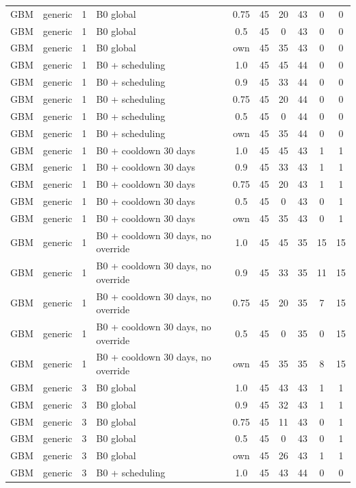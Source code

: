 \begin{longtable}{lllp{4.4cm}cccccc}
GBM & generic & 1 & B0 global & 0.75 & 45 & 20 & 43 & 0 & 0 \\
GBM & generic & 1 & B0 global & 0.5 & 45 & 0 & 43 & 0 & 0 \\
GBM & generic & 1 & B0 global & own & 45 & 35 & 43 & 0 & 0 \\
GBM & generic & 1 & B0 + scheduling & 1.0 & 45 & 45 & 44 & 0 & 0 \\
GBM & generic & 1 & B0 + scheduling & 0.9 & 45 & 33 & 44 & 0 & 0 \\
GBM & generic & 1 & B0 + scheduling & 0.75 & 45 & 20 & 44 & 0 & 0 \\
GBM & generic & 1 & B0 + scheduling & 0.5 & 45 & 0 & 44 & 0 & 0 \\
GBM & generic & 1 & B0 + scheduling & own & 45 & 35 & 44 & 0 & 0 \\
GBM & generic & 1 & B0 + cooldown 30 days & 1.0 & 45 & 45 & 43 & 1 & 1 \\
GBM & generic & 1 & B0 + cooldown 30 days & 0.9 & 45 & 33 & 43 & 1 & 1 \\
GBM & generic & 1 & B0 + cooldown 30 days & 0.75 & 45 & 20 & 43 & 1 & 1 \\
GBM & generic & 1 & B0 + cooldown 30 days & 0.5 & 45 & 0 & 43 & 0 & 1 \\
GBM & generic & 1 & B0 + cooldown 30 days & own & 45 & 35 & 43 & 0 & 1 \\
GBM & generic & 1 & B0 + cooldown 30 days, no override & 1.0 & 45 & 45 & 35 & 15 & 15 \\
GBM & generic & 1 & B0 + cooldown 30 days, no override & 0.9 & 45 & 33 & 35 & 11 & 15 \\
GBM & generic & 1 & B0 + cooldown 30 days, no override & 0.75 & 45 & 20 & 35 & 7 & 15 \\
GBM & generic & 1 & B0 + cooldown 30 days, no override & 0.5 & 45 & 0 & 35 & 0 & 15 \\
GBM & generic & 1 & B0 + cooldown 30 days, no override & own & 45 & 35 & 35 & 8 & 15 \\
GBM & generic & 3 & B0 global & 1.0 & 45 & 43 & 43 & 1 & 1 \\
GBM & generic & 3 & B0 global & 0.9 & 45 & 32 & 43 & 1 & 1 \\
GBM & generic & 3 & B0 global & 0.75 & 45 & 11 & 43 & 0 & 1 \\
GBM & generic & 3 & B0 global & 0.5 & 45 & 0 & 43 & 0 & 1 \\
GBM & generic & 3 & B0 global & own & 45 & 26 & 43 & 1 & 1 \\
GBM & generic & 3 & B0 + scheduling & 1.0 & 45 & 43 & 44 & 0 & 0 \\

\end{longtable}
